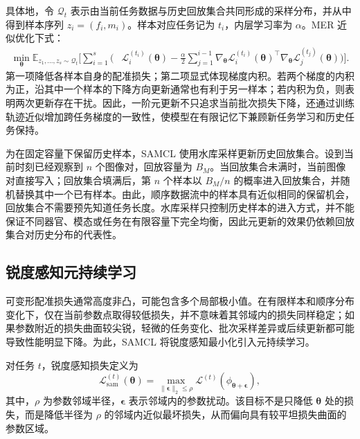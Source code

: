 具体地，令 $\mathcal{Q}_t$ 表示由当前任务数据与历史回放集合共同形成的采样分布，并从中得到样本序列
$z_i=(f_i,m_i)$。样本对应任务记为 $t_i$，内层学习率为 $\alpha$。MER 近似优化下式：
\begin{equation}
\begin{aligned}
\min_{\boldsymbol{\theta}}
\mathbb{E}_{z_1,\ldots,z_s\sim\mathcal{Q}_t}
\Bigg[
\sum_{i=1}^{s}
\Bigg(&
\mathcal{L}^{(t_i)}_i(\boldsymbol{\theta})
-
\frac{\alpha}{2}
\sum_{j=1}^{i-1}
\nabla_{\boldsymbol{\theta}}
\mathcal{L}^{(t_i)}_i(\boldsymbol{\theta})^{\top}
\nabla_{\boldsymbol{\theta}}
\mathcal{L}^{(t_j)}_j(\boldsymbol{\theta})
\Bigg)
\Bigg].
\end{aligned}
\label{eq:samcl-meta-objective}
\end{equation}
第一项降低各样本自身的配准损失；第二项显式体现梯度内积。若两个梯度的内积为正，沿其中一个样本的下降方向更新通常也有利于另一样本；若内积为负，则表明两次更新存在干扰。因此，一阶元更新不只追求当前批次损失下降，还通过训练轨迹近似增加跨任务梯度的一致性，使模型在有限记忆下兼顾新任务学习和历史任务保持。

为在固定容量下保留历史样本，SAMCL 使用水库采样更新历史回放集合。设到当前时刻已经观察到 $n$ 个图像对，回放容量为 $B_M$。当回放集合未满时，当前图像对直接写入；回放集合填满后，第 $n$ 个样本以 $B_M/n$ 的概率进入回放集合，并随机替换其中一个已有样本。由此，顺序数据流中的样本具有近似相同的保留机会，回放集合不需要预先知道任务长度。水库采样只控制历史样本的进入方式，并不能保证不同器官、模态或任务在有限容量下完全均衡，因此元更新的效果仍依赖回放集合对历史分布的代表性。

\subsection{锐度感知元持续学习}
\label{subsec:samcl-sharpness-update}

可变形配准损失通常高度非凸，可能包含多个局部极小值\cite{hill2001registration}。在有限样本和顺序分布变化下，仅在当前参数点取得较低损失，并不意味着其邻域内的损失同样稳定；如果参数附近的损失曲面较尖锐，轻微的任务变化、批次采样差异或后续更新都可能导致性能明显下降。为此，SAMCL 将锐度感知最小化引入元持续学习\cite{foret2021sam}。

对任务 $t$，锐度感知损失定义为
\begin{equation}
\mathcal{L}^{(t)}_{\mathrm{sam}}(\boldsymbol{\theta})
=
\max_{\|\boldsymbol{\epsilon}\|_2\leq\rho}
\mathcal{L}^{(t)}
\left(\phi_{\boldsymbol{\theta}+\boldsymbol{\epsilon}}\right),
\label{eq:samcl-sharpness-loss}
\end{equation}
其中，$\rho$ 为参数邻域半径，$\boldsymbol{\epsilon}$ 表示邻域内的参数扰动。该目标不是只降低 $\boldsymbol{\theta}$ 处的损失，而是降低半径为 $\rho$ 的邻域内近似最坏损失，从而偏向具有较平坦损失曲面的参数区域。

